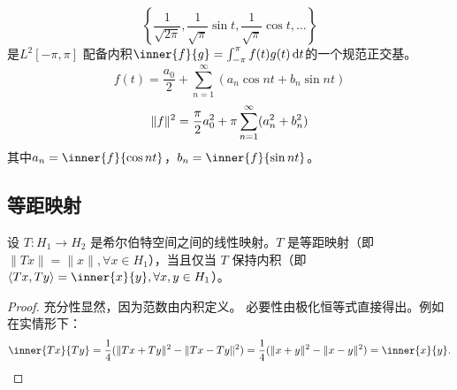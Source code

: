 \begin{example}
    \[
        \left\{ \frac{1}{\sqrt{2\pi}}, \frac{1}{\sqrt{\pi}} \sin t,
        \frac{1}{\sqrt{\pi}} \cos t, \dots \right\}
    \]
    是\(L^{2}[-\pi,\pi]\) 配备内积\(\inner{f}{g} = \int_{-\pi}^{\pi}
    f(t)g(t) \d{t}\)的一个规范正交基。
    \[
        f(t) = \frac{a_0}{2} + \sum_{n=1}^\infty \left( a_n \cos nt +
        b_n \sin nt \right)
    \]
    \[
        \lVert f\rVert^2 = \frac{\pi}{2} a_0^2 + \pi
        \sum_{n=1}^\infty (a_n^2 + b_n^2)
    \]
    其中\(a_{n} = \inner{f}{\cos nt}\)，\(b_{n} = \inner{f}{\sin nt}\)。
\end{example}

\subsection{等距映射}

\begin{example}
    设 \(T: H_1 \to H_2\) 是希尔伯特空间之间的线性映射。\(T\) 是等距映射（即 \(\|Tx\| =
    \|x\|, \forall x \in H_1\)），当且仅当 \(T\) 保持内积（即 \(\langle Tx, Ty
    \rangle = \inner{x}{y}, \forall x, y \in H_1\)）。
\end{example}

\begin{proof}
    充分性显然，因为范数由内积定义。
    必要性由极化恒等式直接得出。例如在实情形下：
    \[
        \inner{Tx}{Ty} = \frac{1}{4}(\|Tx+Ty\|^2 -
        \|Tx-Ty\|^2) = \frac{1}{4}(\|x+y\|^2 - \|x-y\|^2) =
        \inner{x}{y}.
    \]
\end{proof}
